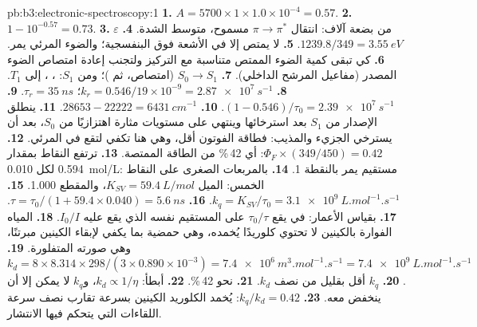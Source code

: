 \begin{solution}{pb:b3:electronic-spectroscopy:1}
\textbf{1.} $A = 5700 \times 1 \times 1.0\times10^{-4} = 0.57$.
\textbf{2.} $1 - 10^{-0.57} = 0.73$.
\textbf{3.} $\varepsilon$ من بضعة آلاف: انتقال $\pi\to\pi^*$ مسموح، متوسط
الشدة.
\textbf{4.} $1239.8/349 = \qty{3.55}{eV}$.
\textbf{5.} لا يمتص إلا في الأشعة فوق البنفسجية؛ والضوء المرئي يمر.
\textbf{6.} كي تبقى كمية الضوء الممتص متناسبة مع التركيز ولتجنب
إعادة امتصاص الضوء المصدر (مفاعيل المرشح الداخلي).
\textbf{7.} $S_0 \to S_1$ (امتصاص، ثم )؛ ومن $S_1$:
، ،  إلى $T_1$.
\textbf{8.} $k_r = 0.546/19 \times 10^{-9} = \qty{2.87e7}{s^{-1}}$؛ $\tau_r = \qty{35}{ns}$.
\textbf{9.} $(1 - 0.546)/\tau_0 = \qty{2.39e7}{s^{-1}}$.
\textbf{10.} $28653 - 22222 = \qty{6431}{cm^{-1}}$.
\textbf{11.} ينطلق الإصدار من $S_1$ بعد استرخائها وينتهي على مستويات مثارة اهتزازيًا
من $S_0$، بعد أن يسترخي الجزيء والمذيب: فطاقة الفوتون
أقل، وهي هنا تكفي لتقع في المرئي.
\textbf{12.} $\Phi_F \times (349/450) = 0.42$: أي 42\,\% من الطاقة الممتصة.
\textbf{13.} ترتفع النقاط بمقدار 0.594 لكل \qty{0.010}{mol/L}: مستقيم يمر بالنقطة 1.
\textbf{14.} بالمربعات الصغرى على النقاط الخمس: الميل $K_{SV} = \qty{59.4}{L/mol}$،
والمقطع 1.000.
\textbf{15.} $k_q = K_{SV}/\tau_0 = \qty{3.1e9}{L.mol^{-1}.s^{-1}}$.
\textbf{16.} $\tau = \tau_0/(1 + 59.4 \times 0.040) = \qty{5.6}{ns}$.
\textbf{17.} بقياس الأعمار: في  يقع $\tau_0/\tau$ على المستقيم نفسه
الذي يقع عليه $I_0/I$.
\textbf{18.} المياه الفوارة بالكينين لا تحتوي كلوريدًا يُخمده، وهي حمضية بما يكفي
لإبقاء الكينين مبرتنًا، وهي صورته المتفلورة.
\textbf{19.} $k_d = 8 \times 8.314 \times 298/(3 \times 0.890\times10^{-3}) =
\qty{7.4e6}{m^3.mol^{-1}.s^{-1}} = \qty{7.4e9}{L.mol^{-1}.s^{-1}}$.
\textbf{20.} $k_q$ أقل بقليل من نصف $k_d$.
\textbf{21.} نحو 42\,\%.
\textbf{22.} أبطأ: $k_d \propto 1/\eta$، و$k_q$ لا يمكن إلا أن ينخفض معه.
\textbf{23.} \textbf{$k_q/k_d = 0.42$}: يُخمد الكلوريد الكينين بسرعة تقارب نصف
سرعة اللقاءات التي يتحكم فيها الانتشار.
\end{solution}
